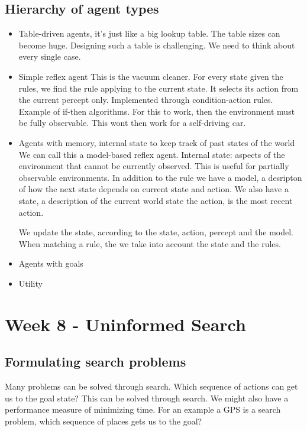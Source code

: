 \documentclass{article}
\begin{document}
\subsection{Hierarchy of agent types}%
\label{sub:hieryachy_of_agent_types}
\begin{itemize}
  \item Table-driven agents, it's just like a big lookup table. 
    \subitem The table sizes can become huge. Designing such a table is
    challenging. We need to think about every single case.
  \item Simple reflex agent
    \subitem This is the vacuum cleaner. For every state given the rules, we
    find the rule applying to the current state. It selects its action from the
    current percept only. Implemented through condition-action rules. Example of
    if-then algorithms. For this to work, then the environment must be fully
    observable. This wont then work for a self-driving car.
  \item Agents with memory, internal state to keep track of past states of the
    world
    \subitem We can call this a model-based reflex agent. Internal state:
    aspects of the environment that cannot be currently observed. This is useful
    for partially observable environments.
    In addition to the rule we have a model, a desripton of how the next state
    depends on current state and action.
    We also have a state, a description of the current world state
    the action, is the most recent action.

    We update the state, according to the state, action, percept and the model.
    When matching a rule, the we take into account the state and the rules.
  \item Agents with goals
    \subitem 
  \item Utility 
\end{itemize}


\newpage


\section{Week 8 - Uninformed Search}

\subsection{Formulating search problems}%
\label{sub:formulating_search_problems}

Many problems can be solved through search. Which sequence of actions can get us
to the goal state? This can be solved through search. We might also have a
performance measure of minimizing time. For an example a GPS is a search
problem, which sequence of places gets us to the goal?
\cite[p. 2]{presentation:solving_problems_by_searching}
\end{document}
